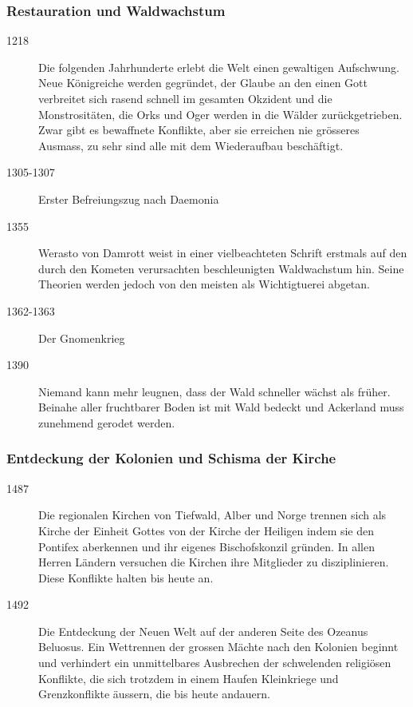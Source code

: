 \documentclass[10pt,twoside,twocolumn,openany]{book}
\begin{document}
	\subsubsection{Restauration und Waldwachstum}
	\begin{description}
		\item[1218] Die folgenden Jahrhunderte erlebt die Welt einen gewaltigen Aufschwung. Neue Königreiche werden gegründet, der Glaube an den einen Gott verbreitet sich rasend schnell im gesamten Okzident und die Monstrositäten, die Orks und Oger werden in die Wälder zurückgetrieben. Zwar gibt es bewaffnete Konflikte, aber sie erreichen nie grösseres Ausmass, zu sehr sind alle mit dem Wiederaufbau beschäftigt.
		\item[1305-1307] Erster Befreiungszug nach Daemonia
		\item[1355] Werasto von Damrott weist in einer vielbeachteten Schrift erstmals auf den durch den Kometen verursachten beschleunigten Waldwachstum hin. Seine Theorien werden jedoch von den meisten als Wichtigtuerei abgetan.
		\item[1362-1363] Der Gnomenkrieg
		\item[1390] Niemand kann mehr leugnen, dass der Wald schneller wächst als früher. Beinahe aller fruchtbarer Boden ist mit Wald bedeckt und Ackerland muss zunehmend gerodet werden.
	\end{description}
	
	\subsubsection{Entdeckung der Kolonien und Schisma der Kirche}
	\begin{description}
		\item[1487] Die regionalen Kirchen von Tiefwald, Alber und Norge trennen sich als Kirche der Einheit Gottes von der Kirche der Heiligen indem sie den Pontifex aberkennen und ihr eigenes Bischofskonzil gründen. In allen Herren Ländern versuchen die Kirchen ihre Mitglieder zu disziplinieren. Diese Konflikte halten bis heute an.
		\item[1492] Die Entdeckung der Neuen Welt auf der anderen Seite des Ozeanus Beluosus. Ein Wettrennen der grossen Mächte nach den Kolonien beginnt und verhindert ein unmittelbares Ausbrechen der schwelenden religiösen Konflikte, die sich trotzdem in einem Haufen Kleinkriege und Grenzkonflikte äussern, die bis heute andauern.
	\end{description}
\end{document}
